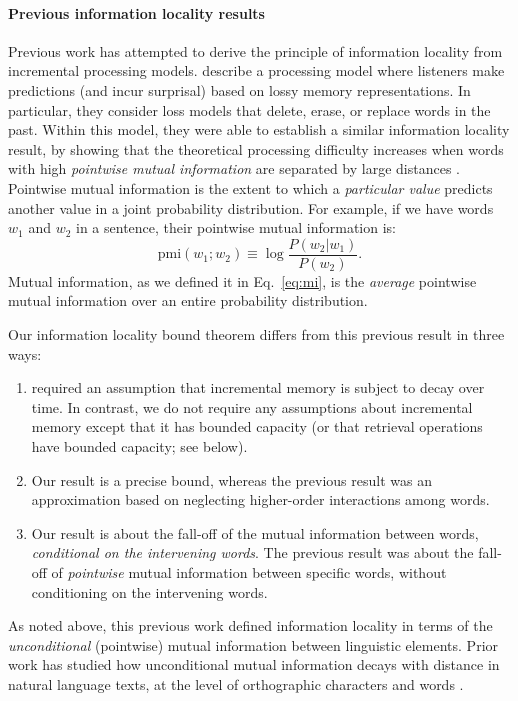 \paragraph{Previous information locality results}

Previous work has attempted to derive the principle of information locality from incremental processing models. 
\citet{futrell2020lossy} describe a processing model where listeners make predictions (and incur surprisal) based on lossy memory representations.
In particular, they consider loss models that delete, erase, or replace words in the past.
Within this model, they were able to establish a similar information locality result, by showing that the theoretical processing difficulty increases when words with high \emph{pointwise mutual information} are separated by large distances \citep{futrell-noisy-context-2017,futrell2019information}. Pointwise mutual information is the extent to which a \emph{particular value} predicts another value in a joint probability distribution. For example, if we have words $w_1$ and $w_2$ in a sentence, their pointwise mutual information is:
\begin{equation*}
    \text{pmi}(w_1; w_2) \equiv \log \frac{P(w_2|w_1)}{P(w_2)}.
\end{equation*}
Mutual information, as we defined it in Eq.~\ref{eq:mi}, is the \emph{average} pointwise mutual information over an entire probability distribution.

Our information locality bound theorem differs from this previous result in three ways:
\begin{enumerate}
    \item \citet{futrell2020lossy} required an assumption that incremental memory is subject to decay over time. In contrast, we do not require any assumptions about incremental memory except that it has bounded capacity (or that retrieval operations have bounded capacity; see below).
    \item Our result is a precise bound, whereas the previous result was an approximation based on neglecting higher-order interactions among words.
    \item Our result is about the fall-off of the mutual information between words, \emph{conditional on the intervening words}. The previous result was about the fall-off of \emph{pointwise} mutual information between specific words, without conditioning on the intervening words.
\end{enumerate}

As noted above, this previous work defined information locality in terms of the \emph{unconditional} (pointwise) mutual information between linguistic elements. 
Prior work has studied how unconditional mutual information decays with distance in natural language texts, at the level of orthographic characters \citep{ebeling-entropy-1994,lin-critical-2017} and words \citep{futrell2019syntactic}.

